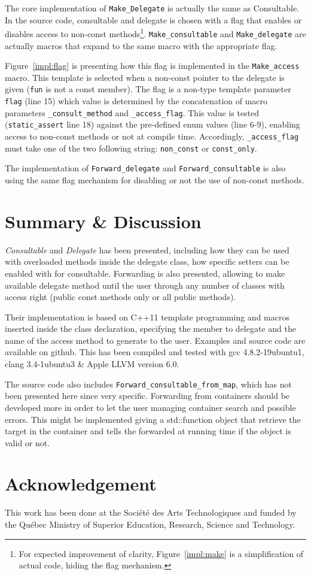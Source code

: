 \documentclass{article}
\begin{document}
The core implementation of \verb+Make_Delegate+ is actually the same as Consultable. In the source code, consultable and delegate is chosen with a flag that enables or disables access to non-const methods\footnote{For expected improvement of clarity, Figure~\ref{impl:make} is a simplification of actual code, hiding the flag mechanism.}. \verb+Make_consultable+ and \verb+Make_delegate+ are actually macros that expand to the same macro with the appropriate flag. 

Figure~\ref{impl:flag} is presenting how this flag is implemented in the \verb+Make_access+ macro. This template is selected when a non-const pointer to the delegate is given (\verb+fun+ is not a const member). The flag is a non-type template parameter \verb+flag+ (line 15) which value is determined by the concatenation of macro parameters \verb+_consult_method+ and \verb+_access_flag+. This value is tested (\verb+static_assert+ line 18) against the pre-defined enum values (line 6-9), enabling access to non-const methods or not at compile time. Accordingly, \verb+_access_flag+ must take one of the two following string: \verb+non_const+ or \verb+const_only+.   
 
The implementation of \verb+Forward_delegate+ and \verb+Forward_consultable+ is also using the same flag mechanism for disabling or not the use of non-const methods. 

\section{Summary \& Discussion}
\textit{Consultable} and \textit{Delegate} has been presented, including how they can be used with overloaded methods inside the delegate class, how specific setters can be enabled with for consultable. Forwarding is also presented, allowing to make available delegate method until the user through any number of classes with access right (public const methods only or all public methods). 

Their implementation is based on C++11 template programming and macros inserted inside the class declaration, specifying the member to delegate and the name of the access method to generate to the user. Examples and source code are available on github. This has been compiled and tested with gcc 4.8.2-19ubuntu1, clang 3.4-1ubuntu3 \& Apple LLVM version 6.0.

The source code also includes \verb+Forward_consultable_from_map+, which has not been presented here since very specific. Forwarding from containers should be developed more in order to let the user managing container search and possible errors. This might be implemented giving a std::function object that retrieve the target in the container and tells the forwarded at running time if the object is valid or not.        

\section{Acknowledgement}
This work has been done at the Société des Arts Technologiques and funded by the Québec Ministry of Superior Education, Research, Science and Technology.


\end{document}
